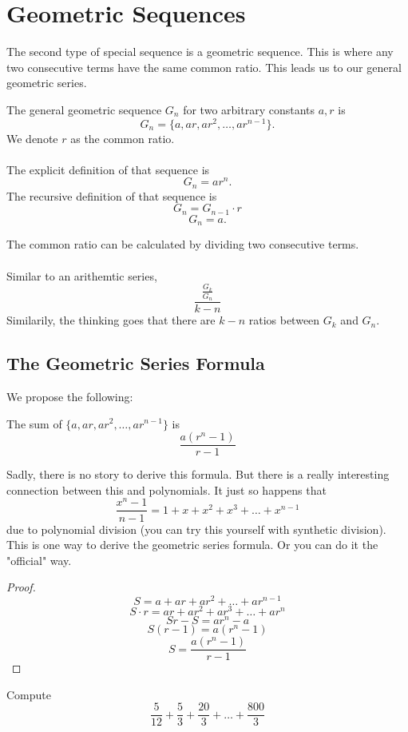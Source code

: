 \section{Geometric Sequences}
The second type of special sequence is a geometric sequence. This is where any two consecutive terms have the same common ratio. This leads us to our general geometric series.
\begin{definition}
    The general geometric sequence $G_n$ for two arbitrary constants $a, r$ is 
    \[G_n=\{a, ar, ar^2, \dots, ar^{n-1}\}.\]
    We denote $r$ as the common ratio.\\\\
    The explicit definition of that sequence is
    \[G_n=ar^n.\]
    The recursive definition of that sequence is
    \[G_n=G_{n-1}\cdot r\]
    \[G_n=a.\]
\end{definition}
The common ratio can be calculated by dividing two consecutive terms.
\\\\
Similar to an arithemtic series, 
\[\frac{\frac{G_k}{G_n}}{k-n}\]
Similarily, the thinking goes that there are $k-n$ ratios between $G_k$ and $G_n$.
\subsection{The Geometric Series Formula}
We propose the following:
\begin{lemma}
    The sum of $\{a, ar, ar^2,\dots,ar^{n-1}\}$ is 
    \[\frac{a(r^n-1)}{r-1}\]
\end{lemma}
Sadly, there is no story to derive this formula. But there is a really interesting connection between this and polynomials. It just so happens that 
\[\frac{x^n-1}{n-1}=1+x+x^2+x^3+\dots+x^{n-1}\]
due to polynomial division (you can try this yourself with synthetic division). This is one way to derive the geometric series formula. Or you can do it the "official" way.
\begin{proof}
    \[S=a+ar+ar^2+\dots+ar^{n-1}\]
    \[S\cdot r=ar+ar^2+ar^3+\dots+ar^n\]
    \[Sr-S=ar^n-a\]
    \[S(r-1)=a(r^n-1)\]
    \[S=\frac{a(r^n-1)}{r-1}\]
\end{proof}
\begin{problem}
    Compute
    \[\frac{5}{12}+\frac{5}{3}+\frac{20}{3}+\dots+\frac{800}{3}\]
\end{problem}
